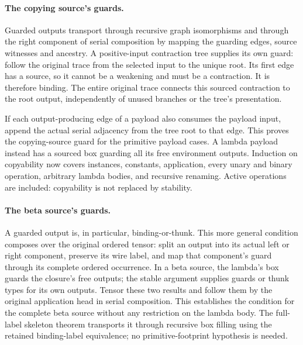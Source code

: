 
\paragraph{The copying source's guards.}
Guarded outputs transport through recursive graph isomorphisms and through
the right component of serial composition by mapping the guarding edges,
source witnesses and ancestry. A positive-input contraction tree supplies
its own guard: follow the original trace from the selected input to the
unique root. Its first edge has a source, so it cannot be a weakening and
must be a contraction. It is therefore binding. The entire original trace
connects this sourced contraction to the root output, independently of
unused branches or the tree's presentation.

If each output-producing edge of a payload also consumes the payload input,
append the actual serial adjacency from the tree root to that edge. This
proves the copying-source guard for the primitive payload cases. A lambda
payload instead has a sourced box guarding all its free environment outputs.
Induction on copyability now covers instances, constants, application, every
unary and binary operation, arbitrary lambda bodies, and recursive renaming.
Active operations are included: copyability is not replaced by stability.

\par{}
\par{}

\paragraph{The beta source's guards.}
A guarded output is, in particular, binding-or-thunk. This more general
condition composes over the original ordered tensor: split an output into
its actual left or right component, preserve its wire label, and map that
component's guard through its complete ordered occurrence. In a beta source,
the lambda's box guards the closure's free outputs; the stable argument
supplies guards or thunk types for its own outputs. Tensor these two results
and follow them by the original application head in serial composition.
This establishes the condition for the complete beta source without any
restriction on the lambda body. The full-label skeleton theorem transports
it through recursive box filling using the retained binding-label equivalence;
no primitive-footprint hypothesis is needed.

